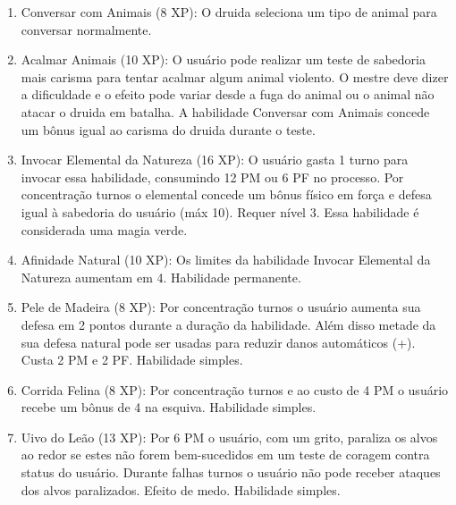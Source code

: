 \begin{enumerate}

  	\item Conversar com Animais (8 XP): O druida seleciona um tipo de animal para conversar normalmente. 
  	
  	\item Acalmar Animais (10 XP): O usuário pode realizar um teste de sabedoria mais carisma para tentar acalmar algum animal violento. O mestre deve dizer a dificuldade e o efeito pode variar desde a fuga do animal ou o animal não atacar o druida em batalha. A habilidade Conversar com Animais concede um bônus igual ao carisma do druida durante o teste.
  
  	\item Invocar Elemental da Natureza (16 XP): O usuário gasta 1 turno para invocar essa habilidade, consumindo 12 PM ou 6 PF no processo. Por concentração turnos o elemental concede um bônus físico em força e defesa igual à sabedoria do usuário (máx 10). Requer nível 3. Essa habilidade é considerada uma magia verde.

		\item Afinidade Natural (10 XP): Os limites da habilidade Invocar Elemental da Natureza aumentam em 4. Habilidade permanente.

  	\item Pele de Madeira (8 XP): Por concentração turnos o usuário aumenta sua defesa em 2 pontos durante a duração da habilidade. Além disso metade da sua defesa natural pode ser usadas para reduzir danos automáticos (+). Custa 2 PM e 2 PF. Habilidade simples.

	\item Corrida Felina (8 XP): Por concentração turnos e ao custo de 4 PM o usuário recebe um bônus de 4 na esquiva. Habilidade simples.

		\item Uivo do Leão (13 XP): Por 6 PM o usuário, com um grito, paraliza os alvos ao redor se estes não forem bem-sucedidos em um teste de coragem contra status do usuário. Durante falhas turnos o usuário não pode receber ataques dos alvos paralizados. Efeito de medo. Habilidade simples.


\end{enumerate}
